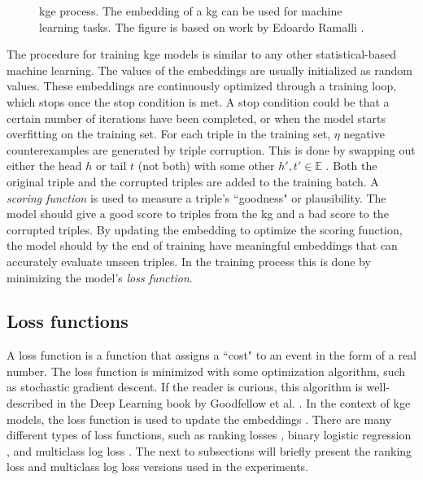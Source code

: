 \begin{figure}[htp]
    \centering
    
    \caption[KGE process.]{\gls{kge} process. The embedding of a \gls{kg} can be used for machine learning tasks. The figure is based on work by Edoardo Ramalli \cite{wiki_KG_embedding}.}
    \label{KG_embdding_diag}
\end{figure}

The procedure for training \gls{kge} models is similar to any other statistical-based machine learning. The values of the embeddings are usually initialized as random values. These embeddings are continuously optimized through a training loop, which stops once the stop condition is met. A stop condition could be that a certain number of iterations have been completed, or when the model starts overfitting on the training set. For each triple in the training set, $\eta$ negative counterexamples are generated by triple corruption. This is done by swapping out either the head $h$ or tail $t$ (not both) with some other $h', t' \in \mathbb{E}$ \cite{TransE}. Both the original triple and the corrupted triples are added to the training batch. A \textit{scoring function} is used to measure a triple's ``goodness" or plausibility. The model should give a good score to triples from the \gls{kg} and a bad score to the corrupted triples. By updating the embedding to optimize the scoring function, the model should by the end of training have meaningful embeddings that can accurately evaluate unseen triples. In the training process this is done by minimizing the model's \textit{loss function}.

\subsection{Loss functions}
A loss function is a function that assigns a ``cost" to an event in the form of a real number. The loss function is minimized with some optimization algorithm, such as stochastic gradient descent. If the reader is curious, this algorithm is well-described in the Deep Learning book by Goodfellow et al. \cite[p. 149]{goodfellow}. In the context of \gls{kge} models, the loss function is used to update the embeddings \cite{dai2020survey}. There are many different types of loss functions, such as ranking losses \cite{TransE}, binary logistic regression \cite{complEx}, and multiclass log loss \cite{kadlec2017knowledge}. The next to subsections will briefly present the ranking loss and multiclass log loss versions used in the experiments.

